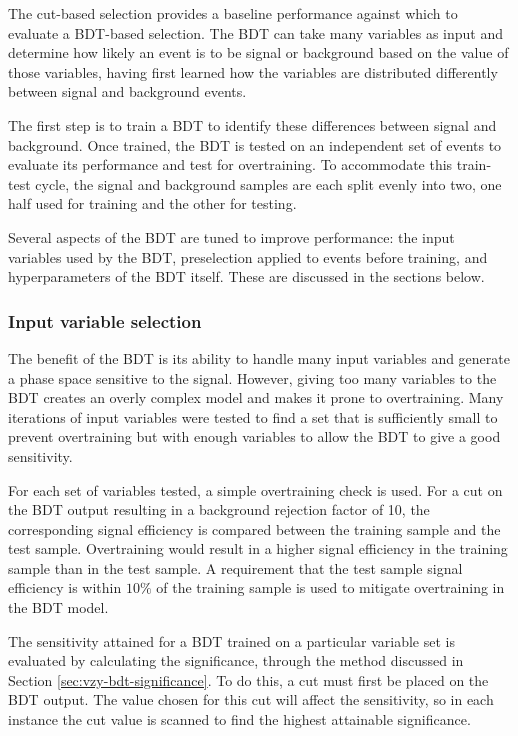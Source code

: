 The cut-based selection provides a baseline performance against which to
evaluate a \ac{BDT}-based selection. The \ac{BDT} can take many variables as
input and determine how likely an event is to be signal or background based on
the value of those variables, having first learned how the variables are
distributed differently between signal and background events.

The first step is to train a \ac{BDT} to identify these differences between
signal and background. Once trained, the \ac{BDT} is tested on an independent
set of events to evaluate its performance and test for overtraining.
To accommodate this train-test cycle, the signal and background samples are each
split evenly into two, one half used for training and the other for testing.

Several aspects of the \ac{BDT} are tuned to improve performance: the input
variables used by the \ac{BDT}, preselection applied to events before training,
and hyperparameters of the \ac{BDT} itself. These are discussed in the sections
below.

\subsubsection{Input variable selection}
\label{sec:vzy-bdt-variables}

The benefit of the \ac{BDT} is its ability to handle many input variables and
generate a phase space sensitive to the signal. However, giving too many
variables to the \ac{BDT} creates an overly complex model and makes it prone to
overtraining. Many iterations of input variables were tested to find a set that
is sufficiently small to prevent overtraining but with enough variables to allow
the \ac{BDT} to give a good sensitivity.

For each set of variables tested, a simple overtraining check is used. For a
cut on the \ac{BDT} output resulting in a background rejection factor of 10, the
corresponding signal efficiency is compared between the training sample and the
test sample. Overtraining would result in a higher signal efficiency in the
training sample than in the test sample. A requirement that the test sample
signal efficiency is within $10\%$ of the training sample is used to mitigate
overtraining in the \ac{BDT} model.

The sensitivity attained for a \ac{BDT} trained on a particular variable set is evaluated
by calculating the significance, through the method discussed in Section
\ref{sec:vzy-bdt-significance}. To do this, a cut must first be placed on the
\ac{BDT} output. The value chosen for this cut will affect the sensitivity, so
in each instance the cut value is scanned to find the highest attainable
significance.

